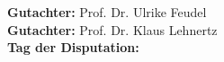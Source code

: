 \newpage  %


\vspace*{\fill}  %
\begin{flushleft}
	\large
    \textbf{Gutachter:} Prof. Dr. Ulrike Feudel  \\[0.2cm]
    \textbf{Gutachter:} Prof. Dr. Klaus Lehnertz \\[0.2cm]
    \textbf{Tag der Disputation:} 
\end{flushleft}

\newpage  %